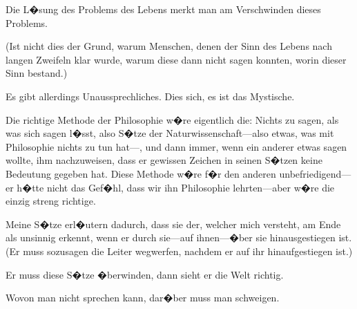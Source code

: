 \begin{propositions}
{Die L�sung des Problems des Lebens merkt
man am Verschwinden dieses Problems.

(Ist nicht dies der Grund, warum Menschen,
denen der Sinn des Lebens nach langen Zweifeln
klar wurde, warum diese dann nicht sagen konnten,
worin dieser Sinn bestand.)}


{Es gibt allerdings Unaussprechliches. Dies
 sich, es ist das Mystische.}


{{\verystretchyspace
Die richtige Methode der Philosophie w�re
eigentlich die: Nichts zu sagen, als was sich sagen
l�sst, also S�tze der Na\-tur\-wis\-sen\-schaft---also etwas,
was mit Philosophie nichts zu tun hat---, und dann
immer, wenn ein anderer etwas 
sagen wollte, ihm nachzuweisen, dass er gewissen
Zeichen in seinen S�tzen keine Bedeutung gegeben
hat. Diese Methode w�re f�r den anderen un\-be\-frie\-di\-gend---er
h�tte nicht das Gef�hl, dass wir
ihn Philosophie lehrten---aber  w�re die einzig
streng richtige.}}


{Meine S�tze erl�utern dadurch, dass sie der,
welcher mich versteht, am Ende als unsinnig
erkennt, wenn er durch sie---auf ihnen---�ber sie
hinausgestiegen ist. (Er muss sozusagen die Leiter
wegwerfen, nachdem er auf ihr hinaufgestiegen ist.)

Er muss diese S�tze �berwinden, dann sieht er
die Welt richtig.}


{Wovon man nicht sprechen kann, dar�ber muss
man schweigen.}
\end{propositions}